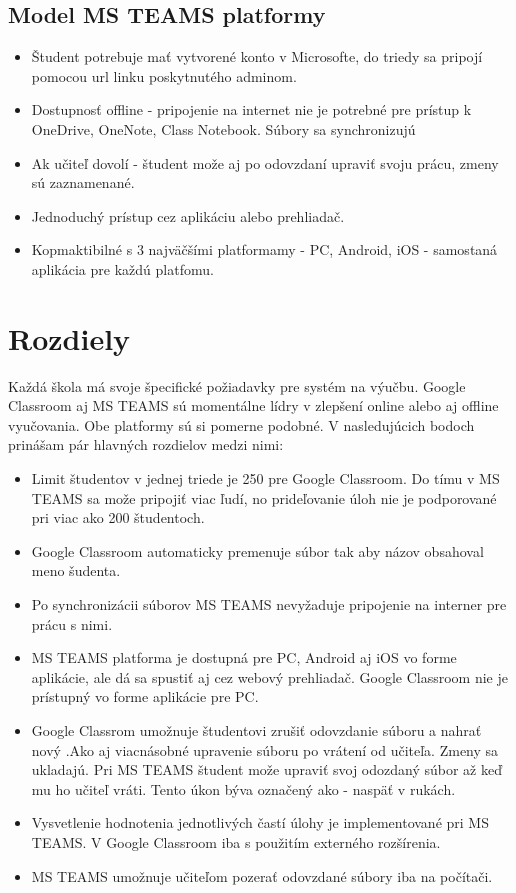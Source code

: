\documentclass[10pt,slovak,a4paper]{article}
\begin{document}
\subsection{Model MS TEAMS platformy} \label{MS TEAMS: MS TEAMS platforma}

\begin{itemize}
	\item Študent potrebuje mať vytvorené konto v Microsofte, do triedy sa pripojí pomocou url linku poskytnutého adminom.
	\item Dostupnosť offline - pripojenie na internet nie je potrebné pre prístup k OneDrive, OneNote, Class Notebook. Súbory sa synchronizujú
 	\item Ak učiteľ dovolí - študent može aj po odovzdaní upraviť svoju prácu, zmeny sú zaznamenané.
	\item Jednoduchý prístup cez aplikáciu alebo prehliadač.
	\item Kopmaktibilné s 3 najväčšími platformamy - PC, Android, iOS - samostaná aplikácia pre každú platfomu. 
\cite {porovnanie}
	\end{itemize}


\section{Rozdiely } \label{Rozdiely}
Každá škola má svoje špecifické požiadavky pre systém na výučbu. Google Classroom aj MS TEAMS sú momentálne lídry v zlepšení online alebo aj offline vyučovania. Obe platformy sú si pomerne podobné. V nasledujúcich bodoch prinášam pár hlavných rozdielov medzi nimi:


\begin{itemize}
	\item Limit študentov v jednej triede je 250 pre Google Classroom.  Do tímu v MS TEAMS sa može pripojiť viac ľudí, no prideľovanie úloh nie je podporované pri viac ako 200 študentoch.
	\item Google Classroom automaticky premenuje súbor tak aby názov obsahoval meno šudenta.
	\item Po synchronizácii súborov MS TEAMS nevyžaduje pripojenie na interner pre prácu s nimi.	
	\item MS TEAMS platforma je dostupná pre PC, Android aj iOS vo forme aplikácie, ale dá sa spustiť aj cez webový prehliadač. Google Classroom nie je prístupný vo forme aplikácie pre PC.
	\item Google Classrom umožnuje študentovi zrušiť odovzdanie súboru a nahrať nový .Ako aj viacnásobné upravenie súboru po vrátení od učiteľa. Zmeny sa ukladajú. Pri MS TEAMS študent može upraviť svoj odozdaný súbor až keď mu ho učiteľ vráti. Tento úkon býva označený ako - naspäť v rukách.
	\item Vysvetlenie hodnotenia jednotlivých častí úlohy je implementované pri MS TEAMS. V Google Classroom iba s použitím externého rozšírenia.
	\item MS TEAMS umožnuje učiteľom pozerať odovzdané súbory iba na počítači.\cite{porovnanie}
\end{itemize}
\end{document}

